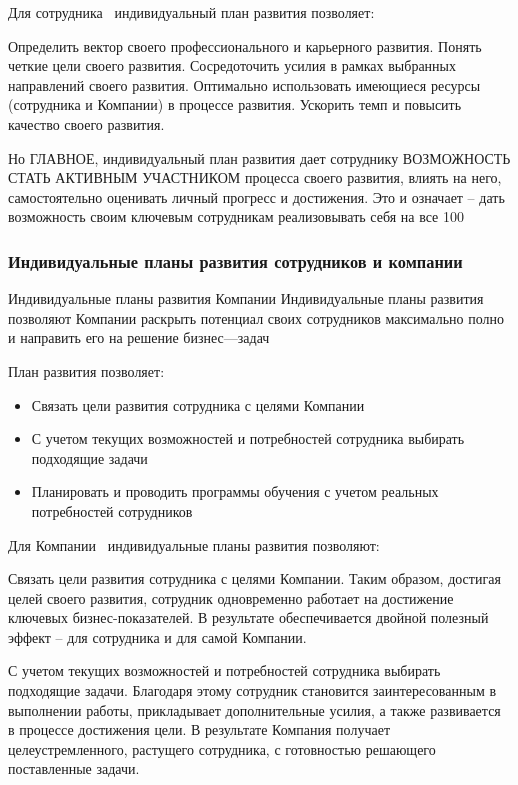 \documentclass{../industrial-development}
\begin{document}
{\lecturenotes
Для сотрудника~\cite{IPl} индивидуальный план развития позволяет:

          Определить вектор своего профессионального и карьерного развития. Понять четкие цели своего развития. 
	Сосредоточить усилия в рамках выбранных направлений своего развития. 
	Оптимально использовать имеющиеся ресурсы (сотрудника и Компании) в процессе развития. 
	Ускорить темп и повысить качество своего развития. 

Но ГЛАВНОЕ, индивидуальный план развития дает сотруднику ВОЗМОЖНОСТЬ СТАТЬ АКТИВНЫМ УЧАСТНИКОМ процесса своего развития, влиять на него, самостоятельно оценивать личный прогресс и достижения. Это и означает – дать возможность своим ключевым сотрудникам реализовывать себя на все 100%


\begin{frame} \frametitle{Индивидуальные планы развития сотрудников и компании}
  \begin{block}{Индивидуальные планы развития Компании}
Индивидуальные планы развития позволяют Компании раскрыть потенциал своих сотрудников максимально полно и направить его на решение бизнес---задач

План развития позволяет:
  \end{block}
  
   \begin{itemize}
  \item Связать цели развития сотрудника с целями Компании
  \item С учетом текущих возможностей и потребностей сотрудника выбирать подходящие задачи
  \item	 Планировать и проводить программы обучения с учетом реальных потребностей сотрудников 
  \end{itemize}
\end{frame}

\lecturenotes
Для Компании~\cite{IPl} индивидуальные планы развития позволяют:

	Связать цели развития сотрудника с целями Компании. Таким образом, достигая целей своего развития, сотрудник одновременно работает на достижение ключевых бизнес-показателей. В результате обеспечивается двойной полезный эффект – для сотрудника и для самой Компании.

	С учетом текущих возможностей и потребностей сотрудника выбирать подходящие задачи. Благодаря этому сотрудник становится заинтересованным в выполнении работы, прикладывает дополнительные усилия, а также развивается в процессе достижения цели. В результате Компания получает целеустремленного, растущего сотрудника, с готовностью решающего поставленные задачи.

}
\end{document}
